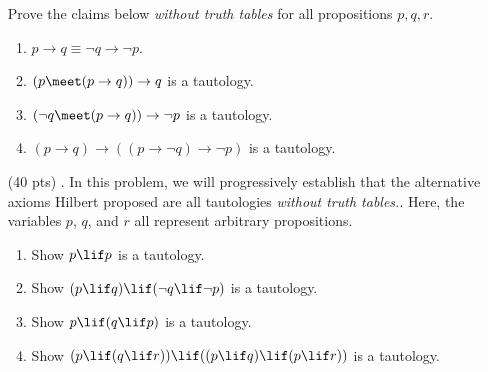 \begin{enumerate}
    Prove the claims below \emph{without truth tables} for all propositions $p, q, r$.
    \begin{enumerate}
      \item
        $p \rightarrow q \equiv \neg q \rightarrow \neg p$.
      \item
        $(p \meet (p \rightarrow q)) \rightarrow q$ is a tautology.
      \item
        $(\neg q \meet (p \rightarrow q)) \rightarrow \neg p$ is a tautology.
      \item
        $(p \rightarrow q) \rightarrow ((p \rightarrow \neg q) \rightarrow \neg p)$ is a tautology.
    \end{enumerate}
  \item[(40 pts) \quad 3.]
    In this problem, we will progressively establish that the alternative axioms Hilbert proposed are all tautologies \emph{without truth tables.}.
    Here, the variables $p$, $q$, and $r$ all represent arbitrary propositions.
    \begin{enumerate}
      \item
        Show $p \lif p$ is a tautology.
      \item
        Show $(p \lif q) \lif (\neg q \lif \neg p)$ is a tautology.
      \item
        Show $p \lif (q \lif p)$ is a tautology.
      \item
        Show $(p \lif (q \lif r)) \lif ((p \lif q) \lif (p \lif r))$ is a tautology.
    \end{enumerate}

\end{enumerate}
